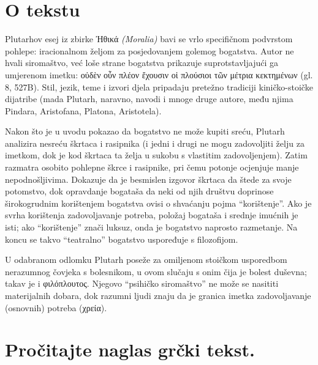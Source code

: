 


\section*{O tekstu}

Plutarhov esej iz zbirke Ἠθικά \textit{(Moralia)} bavi se vrlo specifičnom podvrstom pohlepe: iracionalnom željom za posjedovanjem golemog bogatstva. Autor ne hvali siromaštvo, već loše strane bogatstva prikazuje suprotstavljajući ga umjerenom imetku: \textgreek[variant=ancient]{οὐδὲν οὖν πλέον ἔχουσιν οἱ πλούσιοι τῶν μέτρια κεκτημένων} (gl. 8, 527B). Stil, jezik, teme i izvori djela pripadaju pretežno tradiciji kiničko-stoičke dijatribe (mada Plutarh, naravno, navodi i mnoge druge autore, među njima Pindara, Aristofana, Platona, Aristotela).

Nakon što je u uvodu pokazao da bogatstvo ne može kupiti sreću, Plutarh analizira nesreću škrtaca i rasipnika (i jedni i drugi ne mogu zadovoljiti želju za imetkom, dok je kod škrtaca ta želja u sukobu s vlastitim zadovoljenjem). Zatim razmatra osobito pohlepne škrce i rasipnike, pri čemu potonje ocjenjuje manje nepodnošljivima. Dokazuje da je besmislen izgovor škrtaca da štede za svoje potomstvo, dok opravdanje bogataša da neki od njih društvu doprinose širokogrudnim korištenjem bogatstva ovisi o shvaćanju pojma ``korištenje''. Ako je svrha korištenja zadovoljavanje potreba, položaj bogataša i srednje imućnih je isti; ako ``korištenje'' znači luksuz, onda je bogatstvo naprosto razmetanje. Na koncu se takvo ``teatralno'' bogatstvo uspoređuje s filozofijom.

U odabranom odlomku Plutarh poseže za omiljenom stoičkom usporedbom nerazumnog čovjeka s bolesnikom, u ovom slučaju s onim čija je bolest duševna; takav je i \textgreek[variant=ancient]{φιλόπλουτος.} Njegovo ``psihičko siromaštvo'' ne može se nasititi materijalnih dobara, dok razumni ljudi znaju da je granica imetka zadovoljavanje (osnovnih) potreba \textgreek[variant=ancient]{(χρεία).}


\section*{Pročitajte naglas grčki tekst.}

